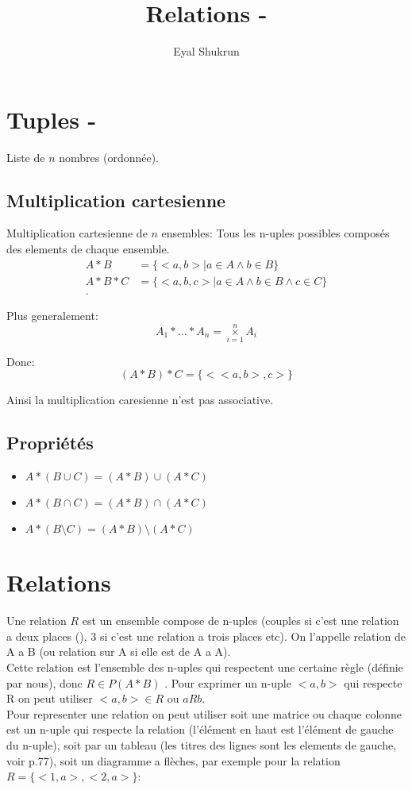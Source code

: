 \documentclass{article}
\title{Relations - \cjRL{y.hsym} }
\author{Eyal Shukrun}
\begin{document}
\maketitle

\section{Tuples - }
Liste de $n$ nombres (ordonnée).

\subsection{Multiplication cartesienne}
Multiplication cartesienne de $n$ ensembles: Tous les n-uples possibles composés des elements de chaque ensemble.
\begin{align*}
  A * B &= \{<a,b> | a \in A \land b \in B\}\\
  A * B * C &= \{<a,b,c> | a \in A \land b \in B \land c \in C\}\\
.\end{align*}

Plus generalement: 
\begin{equation}
  A_1 * \ldots * A_n = \underset{i=1}{\overset{n}{\times}} A_i 
\end{equation}

Donc:
\begin{equation}
  (A*B)*C = \{<<a,b>, c>\}
\end{equation}

Ainsi la multiplication caresienne n'est pas associative.  

\subsection{Propriétés}
\begin{itemize}
  \item $A * (B \cup C) = (A*B) \cup (A*C)$
  \item $A * (B \cap C) = (A*B) \cap (A*C)$
  \item $A * (B \setminus  C) = (A*B) \setminus (A*C)$
\end{itemize}
\section{Relations}
 
Une relation $R$ est un ensemble compose de n-uples (couples si c'est une relation a deux places (), 3 si c'est une relation a trois places etc). On l'appelle relation de A a B (ou relation sur A si elle est de A a A).\\
Cette relation est l'ensemble des n-uples qui respectent une certaine règle (définie par nous), donc $R \in P(A*B)$
. Pour exprimer un n-uple $<a,b>$ qui respecte R on peut utiliser $<a,b> \in R$ ou $aRb$. \\
Pour representer une relation on peut utiliser soit une matrice ou chaque colonne est un n-uple qui respecte la relation (l'élément en haut est l'élément de gauche du n-uple), soit par un tableau (les titres des lignes sont les elements de gauche, voir p.77), soit un diagramme a flèches, par exemple pour la relation $R = \{<1,a>, <2, a>\}$:


\end{document}
